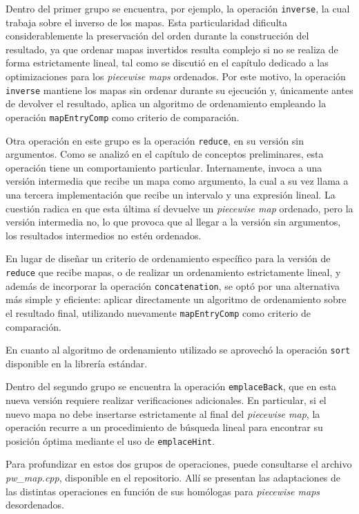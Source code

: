 Dentro del primer grupo se encuentra, por ejemplo, la operación \texttt{inverse}, la cual trabaja sobre el inverso de los mapas. Esta particularidad dificulta considerablemente la preservación del orden durante la construcción del resultado, ya que ordenar mapas invertidos resulta complejo si no se realiza de forma estrictamente lineal, tal como se discutió en el capítulo dedicado a las optimizaciones para los \textit{piecewise maps} ordenados. Por este motivo, la operación \texttt{inverse} mantiene los mapas sin ordenar durante su ejecución y, únicamente antes de devolver el resultado, aplica un algoritmo de ordenamiento empleando la operación \texttt{mapEntryComp} como criterio de comparación.


Otra operación en este grupo es la operación \texttt{reduce}, en su versión sin argumentos. Como se analizó en el capítulo de conceptos preliminares, esta operación tiene un comportamiento particular. Internamente, invoca a una versión intermedia que recibe un mapa como argumento, la cual a su vez llama a una tercera implementación que recibe un intervalo y una expresión lineal. La cuestión radica en que esta última sí devuelve un \textit{piecewise map} ordenado, pero la versión intermedia no, lo que provoca que al llegar a la versión sin argumentos, los resultados intermedios no estén ordenados.

En lugar de diseñar un criterio de ordenamiento específico para la versión de \texttt{reduce} que recibe mapas, o de realizar un ordenamiento estrictamente lineal, y además de incorporar la operación \texttt{concatenation}, se optó por una alternativa más simple y eficiente: aplicar directamente un algoritmo de ordenamiento sobre el resultado final, utilizando nuevamente \texttt{mapEntryComp} como criterio de comparación.


En cuanto al algoritmo de ordenamiento utilizado se aprovechó la operación \texttt{sort} disponible en la librería estándar.

Dentro del segundo grupo se encuentra la operación \texttt{emplaceBack}, que en esta nueva versión requiere realizar verificaciones adicionales. En particular, si el nuevo mapa no debe insertarse estrictamente al final del \textit{piecewise map}, la operación recurre a un procedimiento de búsqueda lineal para encontrar su posición óptima mediante el uso de \texttt{emplaceHint}.

Para profundizar en estos dos grupos de operaciones, puede consultarse el archivo \textit{pw\_map.cpp}, disponible en el repositorio. Allí se presentan las adaptaciones de las distintas operaciones en función de sus homólogas para \textit{piecewise maps} desordenados.



